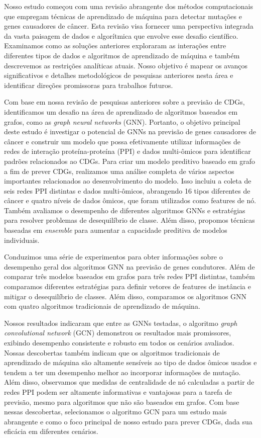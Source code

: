 \documentclass[ppgc, diss, english]{iiufrgs}
\begin{document}
Nosso estudo começou com uma revisão abrangente dos métodos computacionais que empregam técnicas de aprendizado de máquina para detectar mutações e genes causadores de câncer. Esta revisão visa fornecer uma perspectiva integrada da vasta paisagem de dados e algorítmica que envolve esse desafio científico. Examinamos como as soluções anteriores exploraram as interações entre diferentes tipos de dados e algoritmos de aprendizado de máquina e também descrevemos as restrições analíticas atuais. Nosso objetivo é mapear os avanços significativos e detalhes metodológicos de pesquisas anteriores nesta área e identificar direções promissoras para trabalhos futuros.

Com base em nossa revisão de pesquisas anteriores sobre a previsão de CDGs, identificamos um desafio na área de aprendizado de algoritmos baseados em grafos, como as \textit{graph neural networks} (GNN). Portanto, o objetivo principal deste estudo é investigar o potencial de GNNs na previsão de genes causadores de câncer e construir um modelo que possa efetivamente utilizar informações de redes de interação proteína-proteína (PPI) e dados multi-ômicos para identificar padrões relacionados ao CDGs. Para criar um modelo preditivo baseado em grafo a fim de prever CDGs, realizamos uma análise completa de vários aspectos importantes relacionados ao desenvolvimento do modelo. Isso incluiu a coleta de seis redes PPI distintas e dados multi-ômicos, abrangendo 16 tipos diferentes de câncer e quatro níveis de dados ômicos, que foram utilizados como features de nó. Também avaliamos o desempenho de diferentes algoritmos GNNs e estratégias para resolver problemas de desequilíbrio de classe. Além disso, propomos técnicas baseadas em \textit{ensemble} para aumentar a capacidade preditiva de modelos individuais.

Conduzimos uma série de experimentos para obter informações sobre o desempenho geral dos algoritmos GNN na previsão de genes condutores. Além de comparar três modelos baseados em grafos para três redes PPI distintas, também comparamos diferentes estratégias para definir vetores de features de instância e mitigar o desequilíbrio de classes. Além disso, comparamos os algoritmos GNN com quatro algoritmos tradicionais de aprendizado de máquina. 

Nossos resultados indicaram que entre as GNNs testadas, o algoritmo \textit{graph convolutional network} (GCN) demonstrou os resultados mais promissores, exibindo desempenho consistente e robusto em todos os cenários avaliados. Nossas descobertas também indicam que os algoritmos tradicionais de aprendizado de máquina são altamente sensíveis ao tipo de dados ômicos usados e tendem a ter um desempenho melhor ao incorporar informações de mutação. Além disso, observamos que medidas de centralidade de nó calculadas a partir de redes PPI podem ser altamente informativas e vantajosas para a tarefa de previsão, mesmo para algoritmos que não são baseados em grafos. Com base nessas descobertas, selecionamos o algoritmo GCN para um estudo mais abrangente e como o foco principal de nosso estudo para prever CDGs, dada sua eficácia em diferentes cenários.
\end{document}
